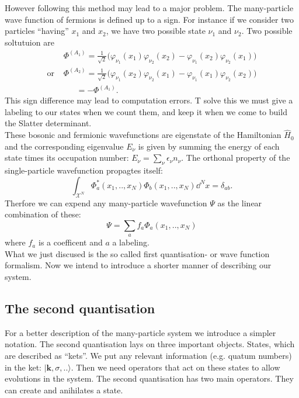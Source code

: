 \documentclass[../main.tex]{subfile}
\begin{document}
However following this method may lead to a major problem. The many-particle wave function of fermions is defined up to a sign. For instance if we consider
two particles ``having'' $x_1$ and $x_2$, we have two possible state $\nu_1$ and $\nu_2$. Two possible soltutuion are
\begin{align*}
    &\Phi^{(A_1)} = \frac{1}{\sqrt{2}} \bigl(\varphi_{\nu_1} (x_1)\varphi_{\nu_2} (x_2) - \varphi_{\nu_1} (x_2)\varphi_{\nu_2} (x_1) \bigr)\\
    \text{or~} &\Phi^{(A_2)} = \frac{1}{\sqrt{2}} \bigl(\varphi_{\nu_1} (x_2)\varphi_{\nu_2}(x_1) - \varphi_{\nu_1} (x_1)\varphi_{\nu_2} (x_2)\bigr)\\
    &~~~~~~~=-\Phi^{(A_1)}.
\end{align*}
This sign difference may lead to computation errors. T solve this we must give a labeling to our states when we count them, and keep it when we 
come to build the Slatter determinant.\\

These bosonic and fermionic wavefunctions are eigenstate of the Hamiltonian $\hat{H}_0$ and the corresponding eigenvalue $E_{\nu}$
is given by summing the energy of each state times its occupation number: $E_{\nu} = \sum_{\nu} \epsilon_{\nu} n_{\nu}$.
The orthonal property of the single-particle wavefunction propagtes itself:
\[
    \int_{\mathcal{X}^N} \Phi_a^{\ast}(x_1,..,x_N) \Phi_b(x_1,..,x_N) \dd^N x = \delta_{ab}.
\]
Therfore we can expend any many-particle wavefunction $\Psi$ as the linear combination of these:
\[
    \Psi = \sum_a f_a \Phi_a(x_1,..,x_N)
\]
where $f_a$ is a coefficent and $a$ a labeling.\\

What we just discused is the so called first quantisation- or wave function formalism. Now we intend to introduce a shorter manner of 
describing our system. 

\subsection{The second quantisation}
For a better description of the many-particle system we introduce a simpler notation. The second quantisation lays on three important objects. 
States, which are described as ``kets''. We put any relevant information (e.g. quatum numbers) in the ket: $|\bm{k}, \sigma,..\rangle$. 
Then we need operators that act on these states to allow evolutions in the system. 
The second quantisation has two main operators. They can create and anihilates a state.\\
\end{document}
